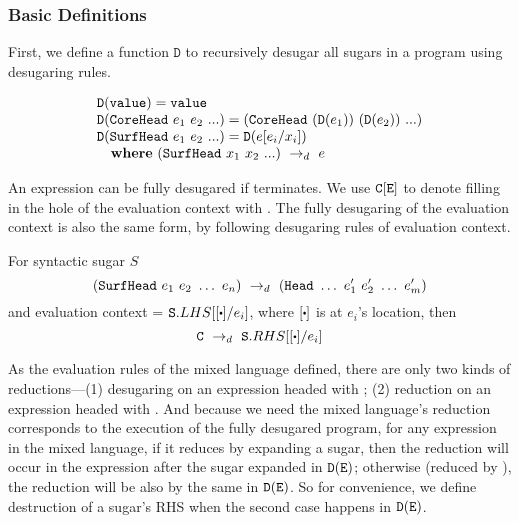 \subsubsection{Basic Definitions}
First, we define a function $\mathtt{D}$ to recursively desugar all sugars in a program using desugaring rules.

\begin{Def}
\[
\begin{array}{lll}
	\mathtt{D}(\texttt{value}) = \texttt{value}\\
	\mathtt{D}(\texttt{CoreHead}~e_1~e_2~ ...) = (\texttt{CoreHead}~(\mathtt{D}(e_1))~(\mathtt{D}(e_2))~...)\\
	\mathtt{D}(\texttt{SurfHead}~e_1~e_2~ ...) = \mathtt{D}(e[e_i/x_i])\\
\quad \mbox{\bf where}~(\texttt{SurfHead}~x_1~x_2~ ...) ~\rightarrow_d~ e

\end{array}
\]

\end{Def}


An expression  can be fully desugared if  terminates. We use $\mbox{\tt C}[\mbox{\tt E}]$ to denote filling in the hole of the evaluation context  with .  The fully desugaring of the evaluation context is also the same form, by following desugaring rules of evaluation context.

\begin{Def}
	For syntactic sugar $S$
	\[
	(\mbox{\tt SurfHead}~e_1~e_2~\ldots~e_n) ~\rightarrow_d~ (\mbox{\tt Head}~\ldots~e_1'~e_2'~\ldots~e_m')
	\]
	and evaluation context  = $\m{S}.LHS[[\bigcdot]/e_i]$, where $[\bigcdot]$ is at $e_i$'s location, then
	\[
	\drule{\m{C}}{\m{S}.RHS[[\bigcdot]/e_i]}
	\]

\end{Def}
As the evaluation rules of the mixed language defined, there are only two kinds of reductions---(1) desugaring on an expression headed with ; (2) reduction on an expression headed with . And because we need the mixed language's reduction corresponds to the execution of the fully desugared program, for any expression  in the mixed language, if it reduces by expanding a sugar, then the reduction will occur in the expression after the sugar expanded in $\mathtt{D}(\mbox{\tt E})$; otherwise (reduced by ), the reduction will be also by the same  in $\mathtt{D}(\mbox{\tt E})$.
So for convenience, we define destruction of a sugar's RHS when the second case happens in $\mathtt{D}(\mbox{\tt E})$.

